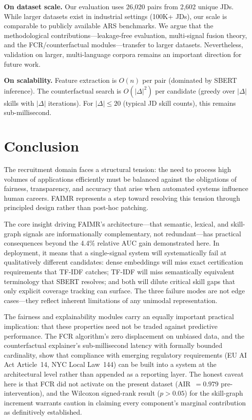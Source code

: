 \documentclass{llncs}
\begin{document}
\textbf{On dataset scale.} Our evaluation uses 26,020 pairs from 2,602 unique JDs. While larger datasets exist in industrial settings (100K+ JDs), our scale is comparable to publicly available ARS benchmarks. We argue that the methodological contributions---leakage-free evaluation, multi-signal fusion theory, and the FCR/counterfactual modules---transfer to larger datasets. Nevertheless, validation on larger, multi-language corpora remains an important direction for future work.

\textbf{On scalability.} Feature extraction is $O(n)$ per pair (dominated by SBERT inference). The counterfactual search is $O(|\Delta|^2)$ per candidate (greedy over $|\Delta|$ skills with $|\Delta|$ iterations). For $|\Delta| \leq 20$ (typical JD skill counts), this remains sub-millisecond.

\section{Conclusion}\label{sec:conclusion}

The recruitment domain faces a structural tension: the need to process high volumes of applications efficiently must be balanced against the obligations of fairness, transparency, and accuracy that arise when automated systems influence human careers. FAIMR represents a step toward resolving this tension through principled design rather than post-hoc patching.

The core insight driving FAIMR's architecture---that semantic, lexical, and skill-graph signals are informationally complementary, not redundant---has practical consequences beyond the 4.4\% relative AUC gain demonstrated here. In deployment, it means that a single-signal system will systematically fail at qualitatively different candidates: dense embeddings will miss exact certification requirements that TF-IDF catches; TF-IDF will miss semantically equivalent terminology that SBERT resolves; and both will dilute critical skill gaps that only explicit coverage tracking can surface. The three failure modes are not edge cases---they reflect inherent limitations of any unimodal representation.

The fairness and explainability modules carry an equally important practical implication: that these properties need not be traded against predictive performance. The FCR algorithm's zero displacement on unbiased data, and the counterfactual explainer's sub-millisecond latency with formally bounded cardinality, show that compliance with emerging regulatory requirements (EU AI Act Article~14, NYC Local Law~144) can be built into a system at the architectural level rather than appended as a reporting layer. The honest caveat here is that FCR did not activate on the present dataset (AIR~$= 0.979$ pre-intervention), and the Wilcoxon signed-rank result ($p > 0.05$) for the skill-graph increment warrants caution in claiming every component's marginal contribution as definitively established.
\end{document}
